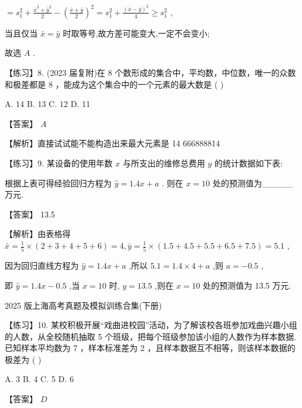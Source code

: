 \documentclass[10pt]{article}
\begin{document}
\(= {s}_{1}^{2} + \frac{{\bar{x}}^{2} + {\bar{y}}^{2}}{2} - {\left( \frac{\bar{x} + \bar{y}}{2}\right) }^{2} = {s}_{1}^{2} + \frac{{\left( \bar{x} - \bar{y}\right) }^{2}}{4} \geq  {s}_{1}^{2}\) ,

当且仅当 \(\bar{x} = \bar{y}\) 时取等号,故方差可能变大,一定不会变小;

故选 \(A\) .

【练习】8. (2023 届复附)在 8 个数形成的集合中，平均数，中位数，唯一的众数和极差都是 8 ，能成为这个集合中的一个元素的最大数是 ( )

A. 14 B. 13 C. 12 D. 11

【答案】 \(A\)

【解析】直接试试能不能构造出来最大元素是 14 666888814

【练习】9. 某设备的使用年数 \(x\) 与所支出的维修总费用 \(y\) 的统计数据如下表:

\begin{center}
\end{center}

根据上表可得经验回归方程为 \(\widehat{y} = {1.4x} + a\) . 则在 \(x = {10}\) 处的预测值为\_\_\_\_\_万元.

【答案】 13.5

【解析】由表格得 \(\bar{x} = \frac{1}{5} \times  \left( {2 + 3 + 4 + 5 + 6}\right)  = 4,\bar{y} = \frac{1}{5} \times  \left( {{1.5} + {4.5} + {5.5} + {6.5} + {7.5}}\right)  = {5.1}\) ,

因为回归直线方程为 \(\widehat{y} = {1.4x} + a\) ,所以 \({5.1} = {1.4} \times  4 + a\) ,则 \(a =  - {0.5}\) ,

即 \(\widehat{y} = {1.4x} - {0.5}\) ,当 \(x = {10}\) 时, \(y = {13.5}\) ,则在 \(x = {10}\) 处的预测值为 13.5 万元.

2025 版上海高考真题及模拟训练合集(下册)

【练习】10. 某校积极开展“戏曲进校园”活动，为了解该校各班参加戏曲兴趣小组的人数，从全校随机抽取 5 个班级，把每个班级参加该小组的人数作为样本数据. 已知样本平均数为 7 ，样本标准差为 2 ，且样本数据互不相等，则该样本数据的极差为 ( )

A. 3 B. 4 C. 5 D. 6

【答案】 \(D\)
\end{document}
